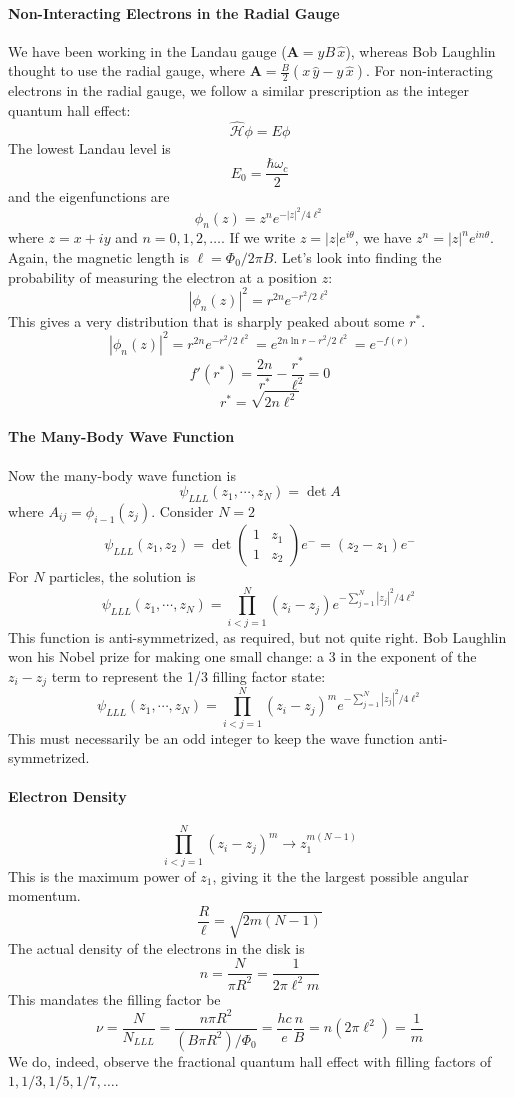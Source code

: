 \documentclass{article}
\begin{document}
	\paragraph{Non-Interacting Electrons in the Radial Gauge} We have been working in the Landau gauge ($\mathbf{A}=yB\,\hat{x}$), whereas Bob Laughlin thought to use the radial gauge, where $\mathbf{A}=\frac{B}{2}\left(x\,\hat{y}-y\,\hat{x}\right)$. For non-interacting electrons in the radial gauge, we follow a similar prescription as the integer quantum hall effect:
	$$\hat{\mathscr{H}}\phi=E\phi$$
	The lowest Landau level is
	$$E_0=\frac{\hbar\omega_c}{2}$$
	and the eigenfunctions are
	$$\phi_n(z)=z^ne^{-\left|z\right|^2/4\ell^2}$$
	where $z=x+iy$ and $n=0,1,2,\ldots$. If we write $z=\left|z\right|e^{i\theta}$, we have $z^n=\left|z\right|^ne^{in\theta}$. Again, the magnetic length is $\ell=\Phi_0/2\pi B$. Let's look into finding the probability of measuring the electron at a position $z$:
	$$\left|\phi_n(z)\right|^2=r^{2n}e^{-r^2/2\ell^2}$$
	This gives a very distribution that is sharply peaked about some $r^*$.
	$$\left|\phi_n(z)\right|^2=r^{2n}e^{-r^2/2\ell^2}=e^{2n\ln r-r^2/2\ell^2}=e^{-f(r)}$$
	$$f'(r^*)=\frac{2n}{r^*}-\frac{r^*}{\ell^2}=0$$
	$$r^*=\sqrt{2n\ell^2}$$
	\paragraph{The Many-Body Wave Function} Now the many-body wave function is
	$$\psi_{LLL}(z_1,\cdots,z_N)=\det A$$
	where $A_{ij}=\phi_{i-1}(z_j)$. Consider $N=2$
	$$\psi_{LLL}(z_1,z_2)=\det\begin{pmatrix}
	1& z_1\\
	1 & z_2\end{pmatrix}e^{-}=(z_2-z_1)e^{-}$$
	For $N$ particles, the solution is
	$$\psi_{LLL}(z_1,\cdots,z_N)=\prod_{i<j=1}^N(z_i-z_j)e^{-\sum_{j=1}^N\left|z_j\right|^2/4\ell^2}$$
	This function is anti-symmetrized, as required, but not quite right. Bob Laughlin won his Nobel prize for making one small change: a 3 in the exponent of the $z_i-z_j$ term to represent the 1/3 filling factor state:
	$$\psi_{LLL}(z_1,\cdots,z_N)=\prod_{i<j=1}^N(z_i-z_j)^me^{-\sum_{j=1}^N\left|z_j\right|^2/4\ell^2}$$
	This must necessarily be an odd integer to keep the wave function anti-symmetrized.
	\paragraph{Electron Density}	
	$$\prod_{i<j=1}^N(z_i-z_j)^m\longrightarrow z_1^{m(N-1)}$$
	This is the maximum power of $z_1$, giving it the the largest possible angular momentum.
	$$\frac{R}{\ell}=\sqrt{2m(N-1)}$$
	The actual density of the electrons in the disk is
	$$n=\frac{N}{\pi R^2}=\frac{1}{2\pi\ell^2m}$$
	This mandates the filling factor be
	$$\nu=\frac{N}{N_{LLL}}=\frac{n\pi R^2}{(B\pi R^2)/\Phi_0}=\frac{hc}{e}\frac{n}{B}=n(2\pi\ell^2)=\frac{1}{m}$$
	We do, indeed, observe the fractional quantum hall effect with filling factors of $1,1/3,1/5,1/7,\ldots$.\\
	
\end{document}
